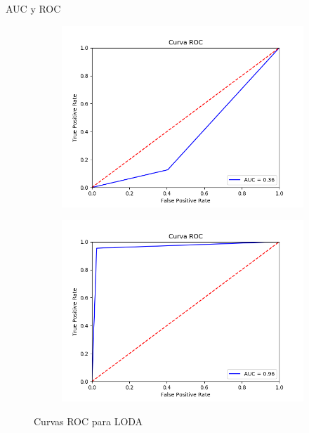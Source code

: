 \documentclass[10pt]{beamer}
\begin{document}
\begin{frame}[fragile]{AUC y ROC}
\vspace{10px}

\begin{figure}[H]
	\centering
	\begin{subfigure}{.49\textwidth}
		\centering
		\includegraphics[scale=0.35]{Imagenes/roc/LODA_satellite}
	\end{subfigure}
	\begin{subfigure}{.49\textwidth}
		\centering
		\includegraphics[scale=0.35]{Imagenes/roc/LODA_breastw}
	\end{subfigure}
	\caption*{Curvas ROC para LODA}
	\label{ROC_LODA}
\end{figure}

\end{frame}
\end{document}
